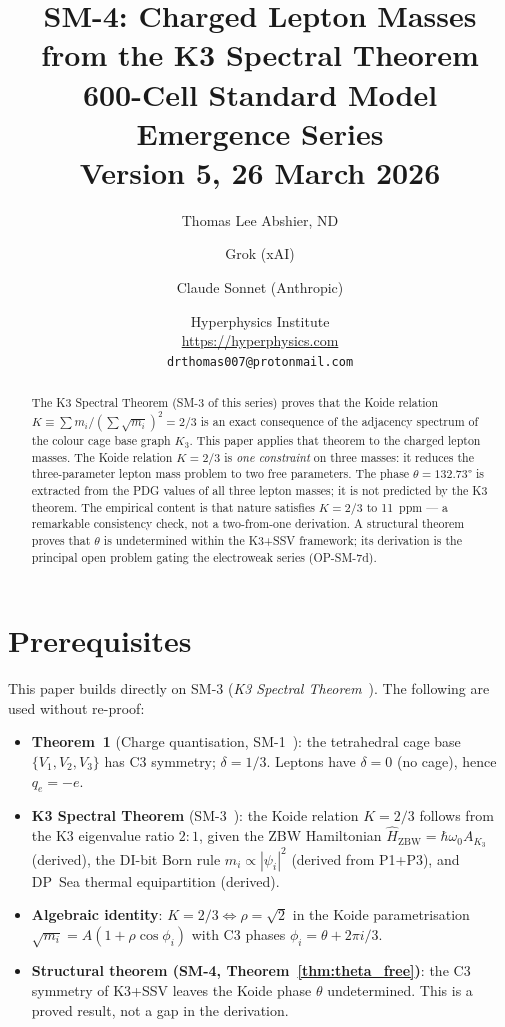 \documentclass[11pt]{article}
\title{\textbf{SM-4: Charged Lepton Masses from the K3 Spectral Theorem}\\[6pt]
{\large 600-Cell Standard Model Emergence Series}\\[4pt]
{\normalsize Version 5, 26 March 2026}}
\author{Thomas Lee Abshier, ND \and Grok (xAI) \and Claude Sonnet (Anthropic)}
\date{\normalsize Hyperphysics Institute\\
\url{https://hyperphysics.com}\\
\texttt{drthomas007@protonmail.com}}
\newcommand{\ZBW}{\mathrm{ZBW}}
\begin{document}
\maketitle

\begin{abstract}
The K3 Spectral Theorem (SM-3 of this series) proves that the Koide
relation $K \equiv \sum m_i/(\sum\sqrt{m_i})^2 = 2/3$ is an exact
consequence of the adjacency spectrum of the colour cage base graph
$K_3$.  This paper applies that theorem to the charged lepton masses.
The Koide relation $K = 2/3$ is \emph{one constraint} on three masses:
it reduces the three-parameter lepton mass problem to two free parameters.
The phase $\theta = 132.73°$ is extracted from the PDG values of all three
lepton masses; it is not predicted by the K3 theorem.
The empirical content is that nature satisfies $K = 2/3$ to 11~ppm ---
a remarkable consistency check, not a two-from-one derivation.
A structural theorem proves that $\theta$ is undetermined
within the K3+SSV framework; its derivation is the principal open problem
gating the electroweak series (OP-SM-7d).
\end{abstract}

\raggedright

\section{Prerequisites}

This paper builds directly on SM-3 (\emph{K3 Spectral Theorem}~\cite{abshier_sm3}).
The following are used without re-proof:

\begin{itemize}
\item \textbf{Theorem~1} (Charge quantisation, SM-1~\cite{abshier_sm1}):
  the tetrahedral cage base $\{V_1,V_2,V_3\}$ has C3 symmetry;
  $\delta = 1/3$.  Leptons have $\delta = 0$ (no cage), hence $q_e = -e$.

\item \textbf{K3 Spectral Theorem} (SM-3~\cite{abshier_sm3}): the Koide
  relation $K = 2/3$ follows from the K3 eigenvalue ratio $2{:}1$, given
  the ZBW Hamiltonian $\hat{H}_\ZBW = \hbar\omega_0 A_{K_3}$ (derived),
  the DI-bit Born rule $m_i \propto |\psi_i|^2$ (derived from P1+P3),
  and DP~Sea thermal equipartition (derived).

\item \textbf{Algebraic identity}: $K = 2/3 \Leftrightarrow \rho = \sqrt{2}$
  in the Koide parametrisation $\sqrt{m_i} = A(1+\rho\cos\phi_i)$
  with C3 phases $\phi_i = \theta + 2\pi i/3$.

\item \textbf{Structural theorem (SM-4, Theorem~\ref{thm:theta_free})}: the
  C3 symmetry of K3+SSV leaves the Koide phase $\theta$ undetermined.
  This is a proved result, not a gap in the derivation.
\end{itemize}
\end{document}
